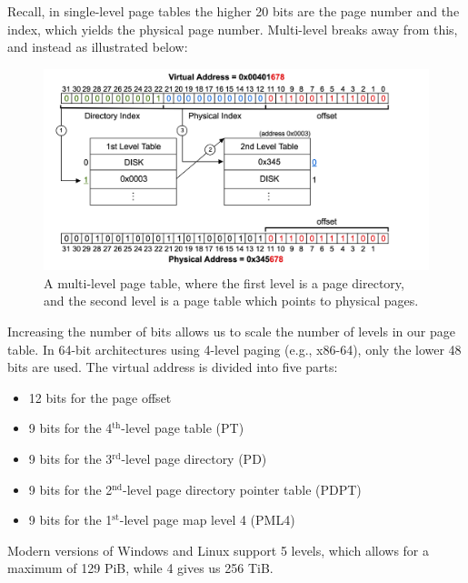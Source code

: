 \newpage 

\noindent
Recall, in single-level page tables the higher 20 bits are the page number and the index, which yields the physical page number.
Multi-level breaks away from this, and instead as illustrated below:
\begin{figure}[h]
    \centering
    \includegraphics[width=\textwidth]{Sections/virt/level.png}
    
    \vspace{1em}
    \caption{A multi-level page table, where the first level is a page directory, and the second level is a page table which points to physical pages.}
    
    \label{fig:virt8}
\end{figure}

\begin{Def}

    Increasing the number of bits allows us to scale the number of levels in our page table.
    In 64-bit architectures using 4-level paging (e.g., x86-64), only the lower 48 bits are used. The virtual address is divided into five parts:
    \begin{itemize}
        \item 12 bits for the page offset
        \item 9 bits for the 4$^{\text{th}}$-level page table (PT)
        \item 9 bits for the 3$^{\text{rd}}$-level page directory (PD)
        \item 9 bits for the 2$^{\text{nd}}$-level page directory pointer table (PDPT)
        \item 9 bits for the 1$^{\text{st}}$-level page map level 4 (PML4)
    \end{itemize}
    \noindent
    Modern versions of Windows and Linux support 5 levels, which allows for a maximum of 129 PiB, while 4 gives us 256 TiB.
\end{Def}

